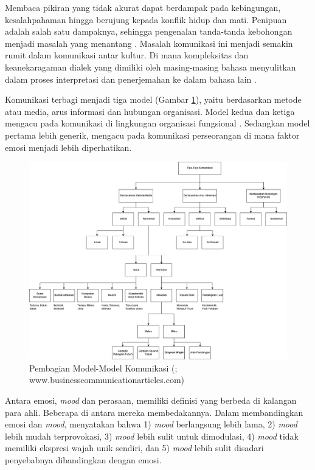Membaca pikiran yang tidak akurat dapat berdampak pada kebingungan, kesalahpahaman hingga berujung kepada konflik hidup dan mati. Penipuan adalah salah satu dampaknya, sehingga pengenalan tanda-tanda kebohongan menjadi masalah yang menantang . Masalah komunikasi ini menjadi semakin rumit dalam komunikasi antar kultur. Di mana kompleksitas dan keanekaragaman dialek yang dimiliki oleh masing-masing bahasa menyulitkan dalam proses interpretasi dan penerjemahan ke dalam bahasa lain .

Komunikasi terbagi menjadi tiga model (Gambar \ref{fig:tipekomunikasi}), yaitu berdasarkan metode atau media, arus informasi dan hubungan organisasi. Model kedua dan ketiga mengacu pada komunikasi di lingkungan organisasi fungsional . Sedangkan model pertama lebih generik, mengacu pada komunikasi perseorangan di mana faktor emosi menjadi lebih diperhatikan.
\begin{figure}[ht]
    \centering
    \includegraphics[width=14cm]{gambar/tipe_tipe_komunikasi.png}
    \caption[Pembagian Model-Model Komunikasi]{Pembagian Model-Model Komunikasi (\protect{};\\www.businesscommunicationarticles.com)}
    \label{fig:tipekomunikasi}
\end{figure}

Antara emosi, \textit{mood} dan perasaan, memiliki definisi yang berbeda di kalangan para ahli. Beberapa di antara mereka membedakannya. Dalam membandingkan emosi dan \textit{mood},  menyatakan bahwa 1) \textit{mood} berlangsung lebih lama, 2) \textit{mood} lebih mudah terprovokasi, 3) \textit{mood} lebih sulit untuk dimodulasi, 4) \textit{mood} tidak memiliki ekspresi wajah unik sendiri, dan 5) \textit{mood} lebih sulit disadari penyebabnya dibandingkan dengan emosi.

